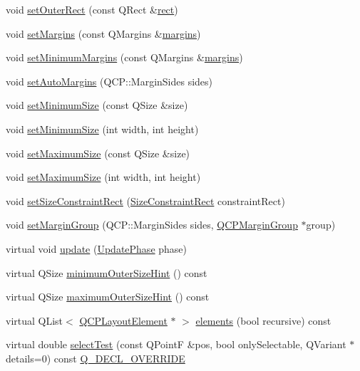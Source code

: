 \begin{DoxyCompactItemize}
\item 
void \hyperlink{class_q_c_p_layout_element_a38975ea13e36de8e53391ce41d94bc0f}{set\+Outer\+Rect} (const Q\+Rect \&\hyperlink{class_q_c_p_layout_element_affdfea003469aac3d0fac5f4e06171bc}{rect})
\item 
void \hyperlink{class_q_c_p_layout_element_a8f450b1f3f992ad576fce2c63d8b79cf}{set\+Margins} (const Q\+Margins \&\hyperlink{class_q_c_p_layout_element_a85ff977dfcced84eef32d9f819ec9543}{margins})
\item 
void \hyperlink{class_q_c_p_layout_element_a0a8a17abc16b7923159fcc7608f94673}{set\+Minimum\+Margins} (const Q\+Margins \&\hyperlink{class_q_c_p_layout_element_a85ff977dfcced84eef32d9f819ec9543}{margins})
\item 
void \hyperlink{class_q_c_p_layout_element_accfda49994e3e6d51ed14504abf9d27d}{set\+Auto\+Margins} (Q\+C\+P\+::\+Margin\+Sides sides)
\item 
void \hyperlink{class_q_c_p_layout_element_a5dd29a3c8bc88440c97c06b67be7886b}{set\+Minimum\+Size} (const Q\+Size \&size)
\item 
void \hyperlink{class_q_c_p_layout_element_a8e0447614a0bf92de9a7304588c6b96e}{set\+Minimum\+Size} (int width, int height)
\item 
void \hyperlink{class_q_c_p_layout_element_a74eb5280a737ab44833d506db65efd95}{set\+Maximum\+Size} (const Q\+Size \&size)
\item 
void \hyperlink{class_q_c_p_layout_element_a03e0e9c48f230217c529b0819f832d84}{set\+Maximum\+Size} (int width, int height)
\item 
void \hyperlink{class_q_c_p_layout_element_a361666cdcc6fbfd37344cc44be746b0f}{set\+Size\+Constraint\+Rect} (\hyperlink{class_q_c_p_layout_element_a0afb3e5773529e4bd20e448f81be4d2a}{Size\+Constraint\+Rect} constraint\+Rect)
\item 
void \hyperlink{class_q_c_p_layout_element_a516e56f76b6bc100e8e71d329866847d}{set\+Margin\+Group} (Q\+C\+P\+::\+Margin\+Sides sides, \hyperlink{class_q_c_p_margin_group}{Q\+C\+P\+Margin\+Group} $\ast$group)
\item 
virtual void \hyperlink{class_q_c_p_layout_element_a929c2ec62e0e0e1d8418eaa802e2af9b}{update} (\hyperlink{class_q_c_p_layout_element_a0d83360e05735735aaf6d7983c56374d}{Update\+Phase} phase)
\item 
virtual Q\+Size \hyperlink{class_q_c_p_layout_element_a4c540ba5c686a1494c92c466912e5411}{minimum\+Outer\+Size\+Hint} () const 
\item 
virtual Q\+Size \hyperlink{class_q_c_p_layout_element_ad60d20664d3950e93c3584e0e7b761bd}{maximum\+Outer\+Size\+Hint} () const 
\item 
virtual Q\+List$<$ \hyperlink{class_q_c_p_layout_element}{Q\+C\+P\+Layout\+Element} $\ast$ $>$ \hyperlink{class_q_c_p_layout_element_a311d60d78e62ef8eaaedb1b6ceb9e788}{elements} (bool recursive) const 
\item 
virtual double \hyperlink{class_q_c_p_layout_element_ae97f483cccedadbf18ea4525ef240ee4}{select\+Test} (const Q\+PointF \&pos, bool only\+Selectable, Q\+Variant $\ast$details=0) const \hyperlink{qcustomplot_8hh_a42cc5eaeb25b85f8b52d2a4b94c56f55}{Q\+\_\+\+D\+E\+C\+L\+\_\+\+O\+V\+E\+R\+R\+I\+DE}
\end{DoxyCompactItemize}

